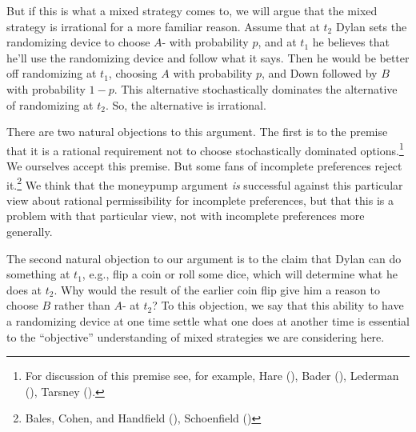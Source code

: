 \documentclass[
  11pt,
  letterpaper,
  DIV=11,
  numbers=noendperiod,
  twoside]{scrartcl}
\begin{document}
But if this is what a mixed strategy comes to, we will argue that the
mixed strategy is irrational for a more familiar reason. Assume that at
\(t_2\) Dylan sets the randomizing device to choose \(A\)- with
probability \(p\), and at \(t_1\) he believes that he'll use the
randomizing device and follow what it says. Then he would be better off
randomizing at \(t_1\), choosing \(A\) with probability \(p\), and Down
followed by \(B\) with probability \(1-p\). This alternative
stochastically dominates the alternative of randomizing at \(t_2\). So,
the alternative is irrational.

There are two natural objections to this argument. The first is to the
premise that it is a rational requirement not to choose stochastically
dominated options.\footnote{For discussion of this premise see, for
  example, Hare (), Bader
  (), Lederman
  (), Tarsney
  ().} We ourselves accept
this premise. But some fans of incomplete preferences reject
it.\footnote{Bales, Cohen, and Handfield
  (), Schoenfield
  ()} We think that the
moneypump argument \emph{is} successful against this particular view
about rational permissibility for incomplete preferences, but that this
is a problem with that particular view, not with incomplete preferences
more generally.

The second natural objection to our argument is to the claim that Dylan
can do something at \(t_1\), e.g., flip a coin or roll some dice, which
will determine what he does at \(t_2\). Why would the result of the
earlier coin flip give him a reason to choose \(B\) rather than \(A\)-
at \(t_2\)? To this objection, we say that this ability to have a
randomizing device at one time settle what one does at another time is
essential to the ``objective'' understanding of mixed strategies we are
considering here.
\end{document}
